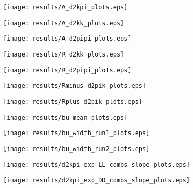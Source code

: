 \documentclass[11pt,a4paper]{article}
\begin{document}
\texttt{[image: results/A\_d2kpi\_plots.eps]}

\texttt{[image: results/A\_d2kk\_plots.eps]}

\texttt{[image: results/A\_d2pipi\_plots.eps]}


\texttt{[image: results/R\_d2kk\_plots.eps]}

\texttt{[image: results/R\_d2pipi\_plots.eps]}


\texttt{[image: results/Rminus\_d2pik\_plots.eps]}

\texttt{[image: results/Rplus\_d2pik\_plots.eps]}


\texttt{[image: results/bu\_mean\_plots.eps]}


\texttt{[image: results/bu\_width\_run1\_plots.eps]}

\texttt{[image: results/bu\_width\_run2\_plots.eps]}

\texttt{[image: results/d2kpi\_exp\_LL\_combs\_slope\_plots.eps]}

\texttt{[image: results/d2kpi\_exp\_DD\_combs\_slope\_plots.eps]}







\end{document}
